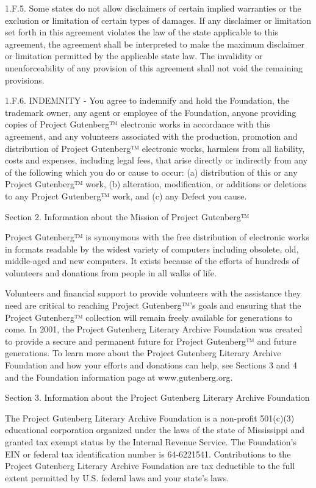 1.F.5. Some states do not allow disclaimers of certain implied
warranties or the exclusion or limitation of certain types of damages.
If any disclaimer or limitation set forth in this agreement violates the
law of the state applicable to this agreement, the agreement shall be
interpreted to make the maximum disclaimer or limitation permitted by
the applicable state law. The invalidity or unenforceability of any
provision of this agreement shall not void the remaining provisions.

1.F.6. INDEMNITY - You agree to indemnify and hold the Foundation, the
trademark owner, any agent or employee of the Foundation, anyone
providing copies of Project Gutenberg™ electronic works in accordance
with this agreement, and any volunteers associated with the production,
promotion and distribution of Project Gutenberg™ electronic works,
harmless from all liability, costs and expenses, including legal fees,
that arise directly or indirectly from any of the following which you do
or cause to occur: (a) distribution of this or any Project Gutenberg™
work, (b) alteration, modification, or additions or deletions to any
Project Gutenberg™ work, and (c) any Defect you cause.

Section 2. Information about the Mission of Project Gutenberg™

Project Gutenberg™ is synonymous with the free distribution of
electronic works in formats readable by the widest variety of computers
including obsolete, old, middle-aged and new computers. It exists
because of the efforts of hundreds of volunteers and donations from
people in all walks of life.

Volunteers and financial support to provide volunteers with the
assistance they need are critical to reaching Project Gutenberg™'s goals
and ensuring that the Project Gutenberg™ collection will remain freely
available for generations to come. In 2001, the Project Gutenberg
Literary Archive Foundation was created to provide a secure and
permanent future for Project Gutenberg™ and future generations. To learn
more about the Project Gutenberg Literary Archive Foundation and how
your efforts and donations can help, see Sections 3 and 4 and the
Foundation information page at www.gutenberg.org.

Section 3. Information about the Project Gutenberg Literary Archive
Foundation

The Project Gutenberg Literary Archive Foundation is a non-profit
501(c)(3) educational corporation organized under the laws of the state
of Mississippi and granted tax exempt status by the Internal Revenue
Service. The Foundation's EIN or federal tax identification number is
64-6221541. Contributions to the Project Gutenberg Literary Archive
Foundation are tax deductible to the full extent permitted by U.S.
federal laws and your state's laws.

